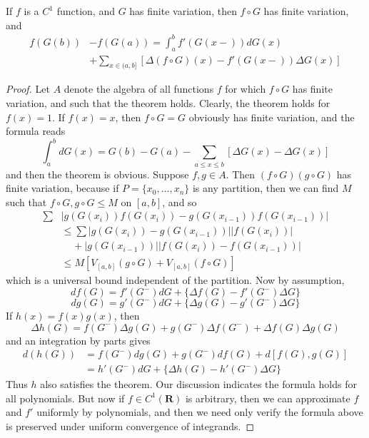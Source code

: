 \begin{theorem}
    If $f$ is a $C^1$ function, and $G$ has finite variation, then $f \circ G$ has finite variation, and
    \begin{align*}
        f(G(b))& - f(G(a)) = \int_a^b f'(G(x-)) dG(x)\\
        &+ \sum_{x \in (a,b]} [\Delta (f \circ G)(x) - f'(G(x-)) \Delta G(x)]
    \end{align*}
\end{theorem}
\begin{proof}
    Let $A$ denote the algebra of all functions $f$ for which $f \circ G$ has finite variation, and such that the theorem holds. Clearly, the theorem holds for $f(x) = 1$. If $f(x) = x$, then $f \circ G = G$ obviously has finite variation, and the formula reads
    \[ \int_a^b dG(x) = G(b) - G(a) - \sum_{a \leq x \leq b} [\Delta G(x) - \Delta G(x)] \]
    and then the theorem is obvious. Suppose $f,g \in A$. Then $(f \circ G)(g \circ G)$ has finite variation, because if $P = \{ x_0, \dots, x_n \}$ is any partition, then we can find $M$ such that $f \circ G, g \circ G \leq M$ on $[a,b]$, and so
    \begin{align*}
        \sum & |g(G(x_i))f(G(x_i)) - g(G(x_{i-1}))f(G(x_{i-1}))|\\
        &\leq \sum |g(G(x_i)) - g(G(x_{i-1}))| |f(G(x_i))|\\
        &\ \ \ \ \ + |g(G(x_{i-1}))| |f(G(x_i)) - f(G(x_{i-1}))|\\
        &\leq M[V_{[a,b]}(g \circ G) + V_{[a,b]}(f \circ G)]
    \end{align*}
    which is a universal bound independent of the partition. Now by assumption,
    \[ df(G) = f'(G^-) dG + \{ \Delta f(G) - f'(G^-) \Delta G \} \]
    \[ dg(G) = g'(G^-) dG + \{ \Delta g(G) - g'(G^-) \Delta G \} \]
    If $h(x) = f(x)g(x)$, then
    \[ \Delta h(G) = f(G^-) \Delta g(G) + g(G^-) \Delta f(G^-) + \Delta f(G) \Delta g(G) \]
    and an integration by parts gives
    \begin{align*}
        d(h(G)) &= f(G^-) dg(G) + g(G^-) df(G) + d[f(G),g(G)]\\
        &= h'(G^-) dG + \{ \Delta h(G) - h'(G^-) \Delta G \}
    \end{align*}
    Thus $h$ also satisfies the theorem. Our discussion indicates the formula holds for all polynomials. But now if $f \in C^1(\mathbf{R})$ is arbitrary, then we can approximate $f$ and $f'$ uniformly by polynomials, and then we need only verify the formula above is preserved under uniform convergence of integrands.
\end{proof}

